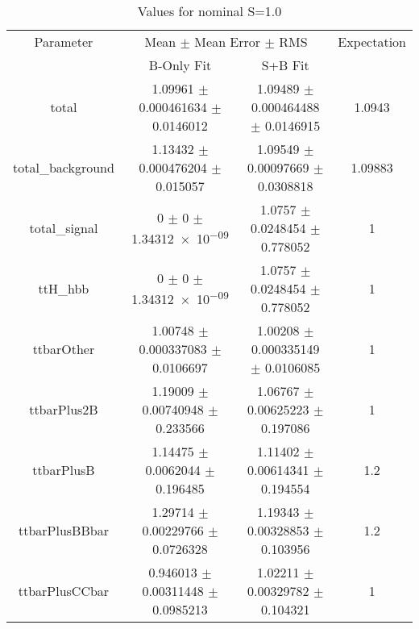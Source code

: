 \begin{table}
\centering
\caption{Values for nominal S=1.0}
\begin{tabular}{cccc}
\toprule
Parameter & \multicolumn{2}{c}{Mean $\pm$ Mean Error $\pm$ RMS} & Expectation\\
 & B-Only Fit & S+B Fit & \\
\midrule
total & \num{1.09961} $\pm$ \num{0.000461634} $\pm$ \num{0.0146012} & \num{1.09489} $\pm$ \num{0.000464488} $\pm$ \num{0.0146915} & \num{1.0943}\\
total\_background & \num{1.13432} $\pm$ \num{0.000476204} $\pm$ \num{0.015057} & \num{1.09549} $\pm$ \num{0.00097669} $\pm$ \num{0.0308818} & \num{1.09883}\\
total\_signal & \num{0} $\pm$ \num{0} $\pm$ \num{1.34312e-09} & \num{1.0757} $\pm$ \num{0.0248454} $\pm$ \num{0.778052} & \num{1}\\
ttH\_hbb & \num{0} $\pm$ \num{0} $\pm$ \num{1.34312e-09} & \num{1.0757} $\pm$ \num{0.0248454} $\pm$ \num{0.778052} & \num{1}\\
ttbarOther & \num{1.00748} $\pm$ \num{0.000337083} $\pm$ \num{0.0106697} & \num{1.00208} $\pm$ \num{0.000335149} $\pm$ \num{0.0106085} & \num{1}\\
ttbarPlus2B & \num{1.19009} $\pm$ \num{0.00740948} $\pm$ \num{0.233566} & \num{1.06767} $\pm$ \num{0.00625223} $\pm$ \num{0.197086} & \num{1}\\
ttbarPlusB & \num{1.14475} $\pm$ \num{0.0062044} $\pm$ \num{0.196485} & \num{1.11402} $\pm$ \num{0.00614341} $\pm$ \num{0.194554} & \num{1.2}\\
ttbarPlusBBbar & \num{1.29714} $\pm$ \num{0.00229766} $\pm$ \num{0.0726328} & \num{1.19343} $\pm$ \num{0.00328853} $\pm$ \num{0.103956} & \num{1.2}\\
ttbarPlusCCbar & \num{0.946013} $\pm$ \num{0.00311448} $\pm$ \num{0.0985213} & \num{1.02211} $\pm$ \num{0.00329782} $\pm$ \num{0.104321} & \num{1}\\
\bottomrule
\end{tabular}
\end{table}